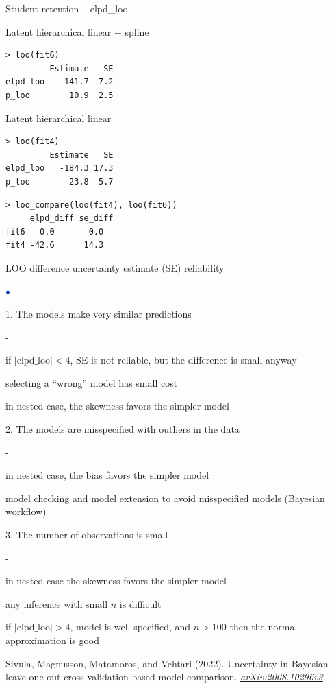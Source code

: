 \documentclass[english,t]{beamer}
\newenvironment{list1}{
   \begin{list}{$\color{list1}\bullet$}{\itemsep=6pt}}{
  \end{list}}
\newenvironment{list2}{
  \begin{list}{-}{\baselineskip=12pt\itemsep=2pt}}{
  \end{list}}
\begin{document}
\begin{frame}[fragile]{Student retention -- elpd\_loo}

  {\color{gray}
Latent hierarchical linear + spline
{\small
\begin{lstlisting}
> loo(fit6)
         Estimate   SE
elpd_loo   -141.7  7.2
p_loo        10.9  2.5
\end{lstlisting}}

Latent hierarchical linear
{\small
\begin{lstlisting}
> loo(fit4)
         Estimate   SE
elpd_loo   -184.3 17.3
p_loo        23.8  5.7
\end{lstlisting}}
}

{\small
\begin{lstlisting}
> loo_compare(loo(fit4), loo(fit6))
     elpd_diff se_diff
fit6   0.0       0.0  
fit4 -42.6      14.3  
\end{lstlisting}}

\end{frame}

\begin{frame}{LOO difference uncertainty estimate (SE) reliability}
\vspace{-0.2\baselineskip}

  \begin{list1}
  \item[1.] The models make very similar predictions
    \begin{list2}
    \item<2-> if $|\mbox{elpd\_loo}|<4$, SE is not reliable, but the
      difference is small anyway
    \item<2-> selecting a ``wrong'' model has small cost
    \item<2-> in nested case, the skewness favors the simpler model
    \end{list2}
  \item[2.] The models are misspecified with outliers in the data
    \begin{list2}
    \item<3-> in nested case, the bias favors the simpler model
    \item<3-> model checking and model extension to avoid misspecified
      models (Bayesian workflow)
    \end{list2}
  \item[3.] The number of observations is small
    \begin{list2}
    \item<4-> in nested case the skewness favors the simpler model
    \item<4-> any inference with small $n$ is difficult
    \item<4-> if $|\mbox{elpd\_loo}|>4$, model is well specified,
      and $n>100$ then the normal approximation is good
    \end{list2}
  \end{list1}

{\color{gray}\footnotesize  Sivula, Magnusson, Matamoros, and Vehtari (2022). Uncertainty in Bayesian leave-one-out cross-validation based model comparison. \textit{\href{https://arxiv.org/abs/2008.10296v3}{arXiv:2008.10296v3}}.}
  
\end{frame}
\end{document}
